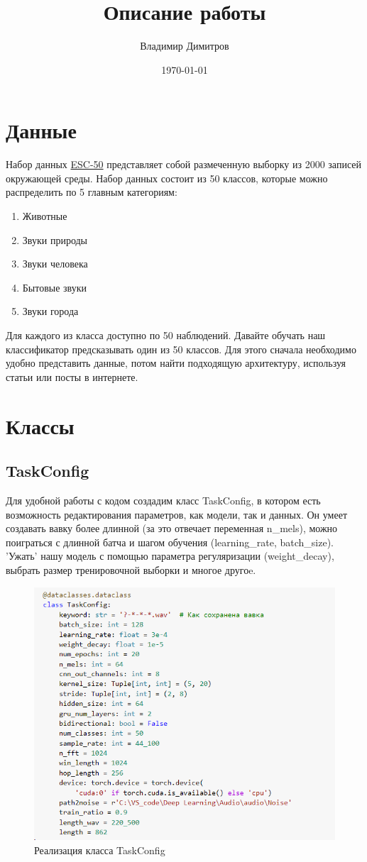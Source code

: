 \documentclass[a4paper,12pt]{article}
\author{Владимир Димитров}
\title{Описание работы}
\date{\today}
\begin{document}
	\maketitle
	\newpage
	\tableofcontents
	\newpage
	\section{Данные}
	Набор данных \href{https://github.com/karolpiczak/ESC-50}{ESC-50} представляет собой размеченную выборку из 2000 записей окружающей среды. Набор данных состоит из 50 классов, которые можно распределить по 5 главным категориям:
	\begin{enumerate}
		\item Животные
		\item Звуки природы
		\item Звуки человека
		\item Бытовые звуки
		\item Звуки города
	\end{enumerate}
	Для каждого из класса доступно по 50 наблюдений. Давайте обучать наш классификатор предсказывать один из 50 классов. Для этого сначала необходимо удобно представить данные, потом найти подходящую архитектуру, используя статьи или посты в интернете.
	
	\section{Классы}
	
	\subsection{TaskConfig}
	Для удобной работы с кодом создадим класс TaskConfig, в котором есть возможность  редактирования параметров, как модели, так и данных. Он умеет создавать вавку более длинной (за это отвечает переменная n\_mels), можно поиграться с длинной батча и шагом обучения (learning\_rate, batch\_size). 'Ужать' нашу модель с помощью параметра регуляризации (weight\_decay), выбрать размер тренировочной выборки и многое другоe.
\begin{figure}[H]
	\centering
	\includegraphics[width=0.9\linewidth]{Image/Taskconfig}
	\caption{Реализация класса TaskConfig}
	\label{fig:taskconfig}
\end{figure}
	
\end{document}
